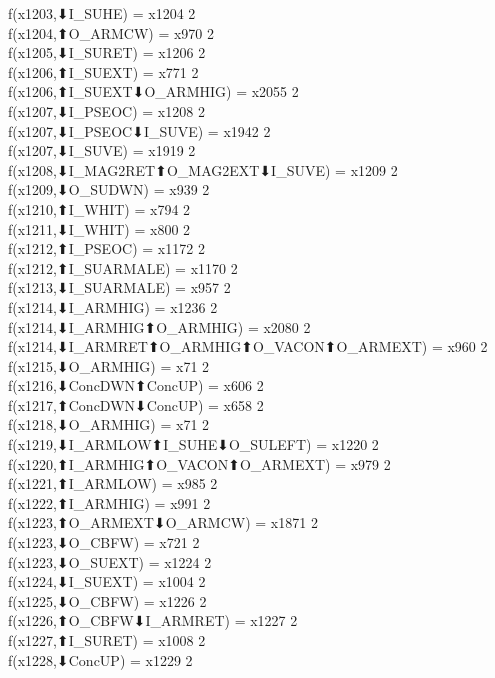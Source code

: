 f(x1203,⬇I_SUHE) = x1204 {2} \\
f(x1204,⬆O_ARMCW) = x970 {2} \\
f(x1205,⬇I_SURET) = x1206 {2} \\
f(x1206,⬆I_SUEXT) = x771 {2} \\
f(x1206,⬆I_SUEXT⬇O_ARMHIG) = x2055 {2} \\
f(x1207,⬇I_PSEOC) = x1208 {2} \\
f(x1207,⬇I_PSEOC⬇I_SUVE) = x1942 {2} \\
f(x1207,⬇I_SUVE) = x1919 {2} \\
f(x1208,⬇I_MAG2RET⬆O_MAG2EXT⬇I_SUVE) = x1209 {2} \\
f(x1209,⬇O_SUDWN) = x939 {2} \\
f(x1210,⬆I_WHIT) = x794 {2} \\
f(x1211,⬇I_WHIT) = x800 {2} \\
f(x1212,⬆I_PSEOC) = x1172 {2} \\
f(x1212,⬆I_SUARMALE) = x1170 {2} \\
f(x1213,⬇I_SUARMALE) = x957 {2} \\
f(x1214,⬇I_ARMHIG) = x1236 {2} \\
f(x1214,⬇I_ARMHIG⬆O_ARMHIG) = x2080 {2} \\
f(x1214,⬇I_ARMRET⬆O_ARMHIG⬆O_VACON⬆O_ARMEXT) = x960 {2} \\
f(x1215,⬇O_ARMHIG) = x71 {2} \\
f(x1216,⬇ConcDWN⬆ConcUP) = x606 {2} \\
f(x1217,⬆ConcDWN⬇ConcUP) = x658 {2} \\
f(x1218,⬇O_ARMHIG) = x71 {2} \\
f(x1219,⬇I_ARMLOW⬆I_SUHE⬇O_SULEFT) = x1220 {2} \\
f(x1220,⬆I_ARMHIG⬆O_VACON⬆O_ARMEXT) = x979 {2} \\
f(x1221,⬆I_ARMLOW) = x985 {2} \\
f(x1222,⬆I_ARMHIG) = x991 {2} \\
f(x1223,⬆O_ARMEXT⬇O_ARMCW) = x1871 {2} \\
f(x1223,⬇O_CBFW) = x721 {2} \\
f(x1223,⬇O_SUEXT) = x1224 {2} \\
f(x1224,⬇I_SUEXT) = x1004 {2} \\
f(x1225,⬇O_CBFW) = x1226 {2} \\
f(x1226,⬆O_CBFW⬇I_ARMRET) = x1227 {2} \\
f(x1227,⬆I_SURET) = x1008 {2} \\
f(x1228,⬇ConcUP) = x1229 {2} \\
